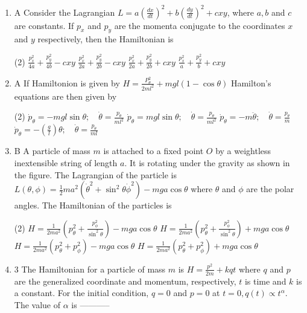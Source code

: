 \begin{enumerate}
	\item A Consider the Lagrangian $L=a\left(\frac{d x}{d t}\right)^{2}+b\left(\frac{d y}{d t}\right)^{2}+c x y$, where $a, b$ and $c$ are constants. If $p_{x}$ and $p_{y}$ are the momenta conjugate to the coordinates $x$ and $y$ respectively, then the Hamiltonian is
	{}
	 \begin{tasks}(2)
		\task[\textbf{a.}]$\frac{p_{x}^{2}}{4 a}+\frac{p_{y}^{2}}{4 b}-c x y$
		\task[\textbf{b.}]$\frac{p_{x}^{2}}{2 a}+\frac{p_{y}^{2}}{2 b}-c x y$
		\task[\textbf{c.}]$\frac{p_{x}^{2}}{2 a}+\frac{p_{y}^{2}}{2 b}+c x y$
		\task[\textbf{d.}] $\frac{p_{x}^{2}}{a}+\frac{p_{y}^{2}}{b}+c x y$
	\end{tasks}
	\item A If Hamiltonion is given by $H=\frac{P_{\theta}^{2}}{2 m l^{2}}+m g l(1-\cos \theta)$ Hamilton's equations are then given by
	{}
	 \begin{tasks}(2)
		\task[\textbf{a.}] $\dot{p}_{\theta}=-m g l \sin \theta ; \quad \dot{\theta}=\frac{p_{\theta}}{m l^{2}}$
		\task[\textbf{b.}]$\dot{p}_{\theta}=m g l \sin \theta ; \quad \dot{\theta}=\frac{p_{\theta}}{m l^{2}}$
		\task[\textbf{c.}]$\dot{p}_{\theta}=-m \ddot{\theta} ; \quad \dot{\theta}=\frac{p_{\theta}}{m}$
		\task[\textbf{d.}] $\dot{p}_{\theta}=-\left(\frac{g}{l}\right) \theta ; \quad \dot{\theta}=\frac{p_{\theta}}{m l}$
	\end{tasks}
	\item B A particle of mass $m$ is attached to a fixed point $O$ by a weightless inextensible string of length $a$. It is rotating under the gravity as shown in the figure. The Lagrangian of the particle is
	$L(\theta, \phi)=\frac{1}{2} m a^{2}\left(\dot{\theta}^{2}+\sin ^{2} \theta \dot{\phi}^{2}\right)-m g a \cos \theta$ where $\theta$ and $\phi$ are the polar angles. The Hamiltonian of the particles is
	{}
	 \begin{tasks}(2)
		\task[\textbf{a.}]$H=\frac{1}{2 m a^{2}}\left(p_{\theta}^{2}+\frac{p_{\phi}^{2}}{\sin ^{2} \theta}\right)-m g a \cos \theta$
		\task[\textbf{b.}]$H=\frac{1}{2 m a^{2}}\left(p_{\theta}^{2}+\frac{p_{\phi}^{2}}{\sin ^{2} \theta}\right)+m g a \cos \theta$
		\task[\textbf{c.}]$H=\frac{1}{2 m a^{2}}\left(p_{\theta}^{2}+p_{\phi}^{2}\right)-m g a \cos \theta$
		\task[\textbf{d.}] $H=\frac{1}{2 m a^{2}}\left(p_{\theta}^{2}+p_{\phi}^{2}\right)+m g a \cos \theta$
	\end{tasks}
	\item 3 The Hamiltonian for a particle of mass $m$ is $H=\frac{p^{2}}{2 m}+k q t$ where $q$ and $p$ are the generalized coordinate and momentum, respectively, $t$ is time and $k$ is a constant. For the initial condition, $q=0$ and $p=0$ at $t=0, q(t) \propto t^{\alpha}$. The value of $\alpha$ is -----------

\end{enumerate}

